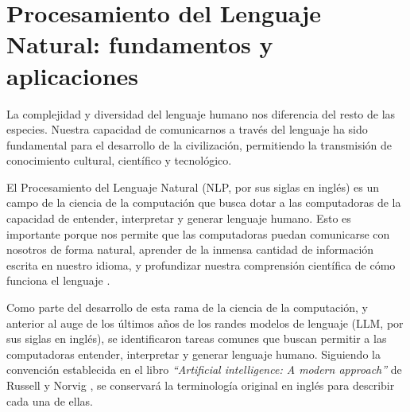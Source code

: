 \section{Procesamiento del Lenguaje Natural: fundamentos y aplicaciones}\label{section: nlp}
La complejidad y diversidad del lenguaje humano nos diferencia del resto de las 
especies. Nuestra capacidad de comunicarnos a través del lenguaje ha sido 
fundamental para el desarrollo de la civilización, permitiendo la transmisión de 
conocimiento cultural, científico y tecnológico.

El Procesamiento del Lenguaje Natural (NLP, por sus siglas en inglés) es un campo 
de la ciencia de la computación que busca dotar a las computadoras 
de la capacidad de entender, interpretar y generar lenguaje humano. 
Esto es importante porque nos permite que las computadoras puedan comunicarse con 
nosotros de forma natural, aprender de la inmensa cantidad de información escrita 
en nuestro idioma, y profundizar nuestra comprensión científica de cómo funciona 
el lenguaje \cite{Russell2020}.

Como parte del desarrollo de esta rama de la ciencia de la computación, y anterior 
al auge de los últimos años de los randes modelos de lenguaje (LLM, por sus siglas en inglés), 
se identificaron tareas comunes que buscan permitir a las computadoras entender, 
interpretar y generar lenguaje humano. Siguiendo la convención establecida en 
el libro \textit{``Artificial intelligence: A modern approach''} de Russell y Norvig \cite{Russell2020}, 
se conservará la terminología original en inglés para describir cada una de ellas.

